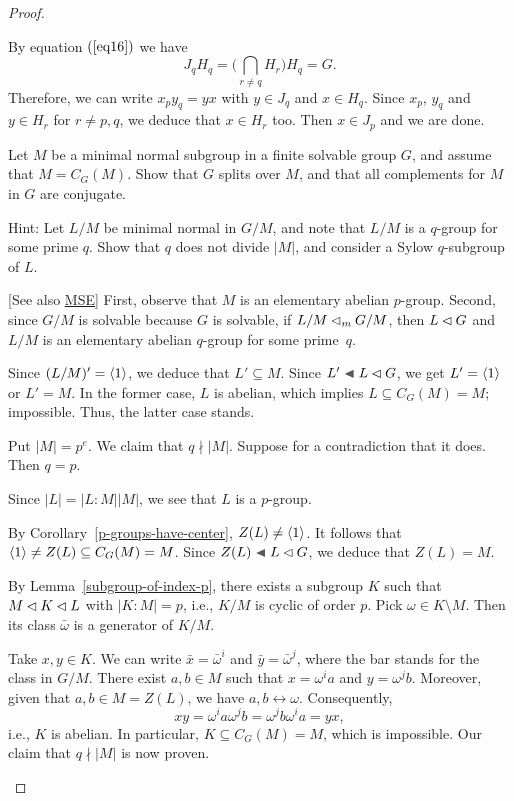 \begin{proof}
\begin{solution}
\begin{enumerate}[a),font=\upshape]
    By equation $(\ref{eq16})$ we have
    $$
        J_qH_q=\Big(\bigcap_{r\ne q}H_r\Big)H_q = G.
    $$
    Therefore, we can write $x_py_q=yx$ with $y\in J_q$ and $x\in H_q$. Since $x_p$, $y_q$ and $y\in H_r$ for $r\ne p,q$, we deduce that $x\in H_r$ too. Then $x\in J_p$ and we are done.
\end{enumerate}
\end{solution}

\begin{probl}
    Let\/ $M$ be a minimal normal subgroup in a finite solvable group\/ $G$, and assume that\/ $M = C_G(M)$. Show that\/ $G$ splits over\/ $M$, and that all complements for\/ $M$ in\/ $G$ are conjugate.

    {\upshape Hint: Let $L/M$ be minimal normal in $G/M$, and note that $L/M$ is a $q$-group for some prime $q$. Show that $q$ does not divide $|M|$, and consider a Sylow $q$-subgroup of $L$.}
\end{probl}

\begin{solution} {[See also \href{https://math.stackexchange.com/a/617987/269050}{MSE}]} First, observe that $M$ is an elementary abelian $p$-group. Second, since $G/M$ is solvable because $G$ is solvable, if $L/M\lhd_mG/M$, then $L\lhd G$ and $L/M$ is an elementary abelian $q$-group for some prime~$q$.

Since $(L/M)'=\langle1\rangle$, we deduce that $L'\subseteq M$. Since $L'\ch L\normal G$, we get $L'=\langle1\rangle$ or $L'=M$. In the former case, $L$ is abelian, which implies $L\subseteq C_G(M)=M$; impossible. Thus, the latter case stands. 

Put $|M|=p^e$. We claim that $q\nmid|M|$. Suppose for a contradiction that it does. Then $q=p$.

Since $|L|=|L:M||M|$, we see that $L$ is a $p$-group.

By Corollary~\ref{p-groups-have-center}, $Z(L)\ne\langle1\rangle$. It follows that $\langle1\rangle\ne Z(L)\subseteq C_G(M)=M$. Since $Z(L)\ch L\normal G$, we deduce that $Z(L)=M$.

By Lemma~\ref{subgroup-of-index-p}, there exists a subgroup $K$ such that $M\lhd K\lhd L$ with $|K:M|=p$, i.e., $K/M$ is cyclic of order $p$. Pick $\omega\in K\setminus M$. Then its class $\bar\omega$ is a generator of $K/M$.

Take $x,y\in K$. We can write $\bar x=\bar\omega^i$ and $\bar y=\bar\omega^j$, where the bar stands for the class in $G/M$. There exist $a,b\in M$ such that $x=\omega^ia$ and $y=\omega^jb$. Moreover, given that $a,b\in M=Z(L)$, we have $a,b\leftrightarrow\omega$. Consequently,
$$
    xy=\omega^ia\omega^jb=\omega^jb\omega^ia=yx,
$$
i.e., $K$ is abelian. In particular, $K\subseteq C_G(M)=M$, which is impossible. Our claim that $q\nmid|M|$ is now proven.


\end{solution}
\end{proof}
